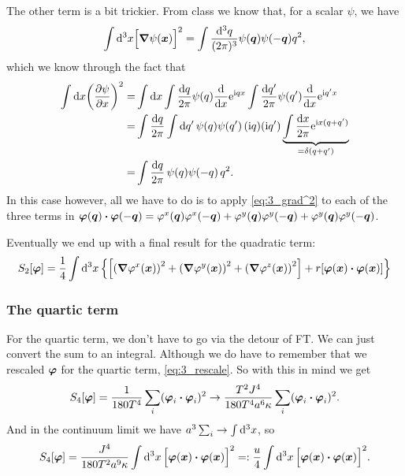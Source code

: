 \documentclass[11pt,letter, swedish, english
]{article}
\begin{document}
The other term is a bit trickier. From class we know that, for a
scalar $\psi$, we have
\begin{equation}\label{eq:3_grad^2}
\int\rd^3x \Big[\grad\psi(\vb*x)\Big]^2
=\int\frac{\rd^3q}{(2\pi)^3}\psi(\vb*q)\psi(-\vb*q)q^2,
\end{equation}
which we know through the fact that
\begin{equation}
\begin{aligned}
\int\rd{x}\qty(\pdv{\psi}{x})^2=&
\int\rd{x}\int\frac{\rd{q}}{2\pi}\psi(q)\dv{x}\ee^{\ii qx}
\int\frac{\rd{q'}}{2\pi}\psi(q')\dv{x}\ee^{\ii q'x}\\
=&\int\frac{\rd{q}}{2\pi}\int\rd{q'}\,\psi(q)\psi(q')\,(\ii q)(\ii q')
\underbrace{\int\frac{\rd{x}}{2\pi}\ee^{\ii x(q+q')}}_{=\delta(q+q')}\\
=&\int\frac{\rd{q}}{2\pi}\,\psi(q)\psi(-q)\,q^2.
\end{aligned}
\end{equation}
In this case however, all we have to do is to apply
\eqref{eq:3_grad^2} to each of the three terms in 
$\vb*\varphi(\vb*q)\vdot\vb*\varphi(-\vb*q)
=\varphi^x(\vb*q)\varphi^x(-\vb*q)
+\varphi^y(\vb*q)\varphi^y(-\vb*q)+
\varphi^y(\vb*q)\varphi^y(-\vb*q)$. 

Eventually we end up with a final result for the quadratic term:
\begin{equation}
S_2[\vb*\varphi]=\frac{1}{4}\int\rd^3x\,
\qty{\qty[\qty(\grad\varphi^x(\vb*x))^2
+\qty(\grad\varphi^y(\vb*x))^2
+\qty(\grad\varphi^z(\vb*x))^2]
+r[\vb*\varphi(\vb*x)\vdot\vb*\varphi(\vb*x)]}
\end{equation}


\subsubsection{The quartic term}
For the quartic term, we don't have to go via the detour of FT. We can
just convert the sum to an integral. Although we do have to remember that we
rescaled $\vb*\varphi$ for the quartic term, \eqref{eq:3_rescale}. So
with this in mind we get
\begin{equation}
S_4[\vb*\varphi]=
\frac{1}{180T^4}\sum_i(\vb*\varphi_i\vdot\vb*\varphi_i)^2
\to \frac{T^2J^4}{180T^4a^6\kappa}
\sum_i(\vb*\varphi_i\vdot\vb*\varphi_i)^2.
\end{equation}
And in the continuum limit we have
$a^3\sum_i\to\int\rd^3x$, so 
\begin{equation}
S_4[\vb*\varphi]=\frac{J^4}{180T^2a^9\kappa}
\int\rd^3x\,\Big[\vb*\varphi(\vb*x)\vdot\vb*\varphi(\vb*x)\Big]^2
=:\frac{u}{4}
\int\rd^3x\,\Big[\vb*\varphi(\vb*x)\vdot\vb*\varphi(\vb*x)\Big]^2.
\end{equation}
\end{document}
